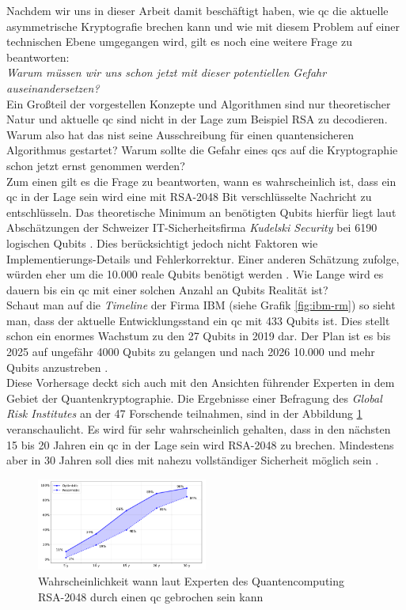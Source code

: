 Nachdem wir uns in dieser Arbeit damit beschäftigt haben, wie \ac{qc} die aktuelle asymmetrische Kryptografie brechen kann und wie mit diesem Problem auf einer technischen Ebene umgegangen wird, gilt es noch eine weitere Frage zu beantworten: \\
\textit{Warum müssen wir uns schon jetzt mit dieser potentiellen Gefahr auseinandersetzen?}\\
Ein Großteil der vorgestellen Konzepte und Algorithmen sind nur theoretischer Natur und aktuelle \ac{qc} sind nicht in der Lage zum Beispiel RSA zu decodieren. Warum also hat das \ac{nist} seine Ausschreibung für einen quantensicheren Algorithmus gestartet? Warum sollte die Gefahr eines \ac{qc}s auf die Kryptographie schon jetzt ernst genommen werden?\\
Zum einen gilt es die Frage zu beantworten, wann es wahrscheinlich ist, dass ein \ac{qc} in der Lage sein wird eine mit RSA-2048 Bit verschlüsselte Nachricht zu entschlüsseln. Das theoretische Minimum an benötigten Qubits hierfür liegt laut Abschätzungen der Schweizer IT-Sicherheitsfirma \textit{Kudelski Security} bei 6190 logischen Qubits \cite{gagliardoni_quantum_2021}. Dies berücksichtigt jedoch nicht Faktoren wie Implementierungs-Details und Fehlerkorrektur. Einer anderen Schätzung zufolge, würden eher um die 10.000 reale Qubits benötigt werden \cite{ziegler_online_2015}. Wie Lange wird es dauern bis ein \ac{qc} mit einer solchen Anzahl an Qubits Realität ist?\\
Schaut man auf die \textit{Timeline} der Firma IBM (siehe Grafik \ref{fig:ibm-rm}) so sieht man, dass der aktuelle Entwicklungsstand ein \ac{qc} mit 433 Qubits ist. Dies stellt schon ein enormes Wachstum zu den 27 Qubits in 2019 dar. Der Plan ist es bis 2025 auf ungefähr 4000 Qubits zu gelangen und nach 2026 10.000 und mehr Qubits anzustreben \cite{noauthor_ibm_2015}.\\
Diese Vorhersage deckt sich auch mit den Ansichten führender Experten in dem Gebiet der Quantenkryptographie. Die Ergebnisse einer Befragung des \textit{Global Risk Institutes} an der 47 Forschende teilnahmen, sind in der Abbildung \ref{fig:qx-approx} veranschaulicht. Es wird für sehr wahrscheinlich gehalten, dass in den nächsten 15 bis 20 Jahren ein \ac{qc} in der Lage sein wird RSA-2048 zu brechen. Mindestens aber in 30 Jahren soll dies mit nahezu vollständiger Sicherheit möglich sein \cite{noauthor_2021_nodate}.

\begin{figure}[!hbt]
    \centering
    \includegraphics[width=0.5\textwidth]{images/estiamte-qc.png}
    \caption{Wahrscheinlichkeit wann laut Experten des Quantencomputing RSA-2048 durch einen \ac{qc} gebrochen sein kann \cite{noauthor_2021_nodate}}
    \label{fig:qx-approx}
\end{figure}\